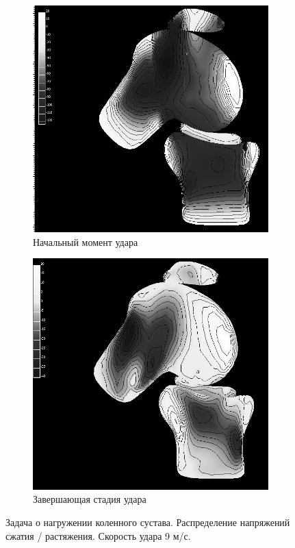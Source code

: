 \begin{figure}[H]
\centering
\begin{subfigure}[b]{0.4\textwidth}
\centering
\includegraphics[width=\textwidth]{png/cranium/knee-res-2-bw.png}
\caption{Начальный момент удара}
\end{subfigure}
\begin{subfigure}[b]{0.4\textwidth}
\centering
\includegraphics[width=\textwidth]{png/cranium/knee-res-3-bw.png}
\caption{Завершающая стадия удара}
\end{subfigure}
\caption{Задача о нагружении коленного сустава. Распределение напряжений сжатия / растяжения. Скорость удара 9 м/с.}
\label{pic:knee_res_2}
\end{figure}

